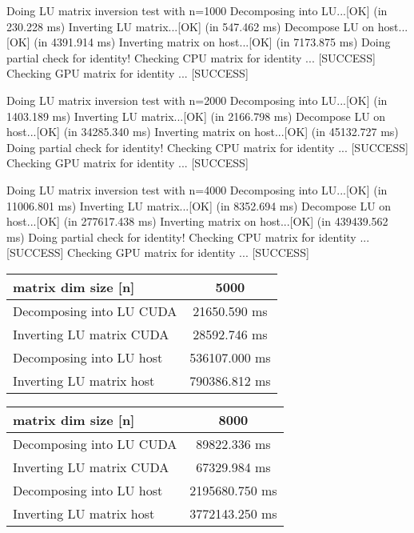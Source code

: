 
Doing LU matrix inversion test with n=1000
Decomposing into LU...[OK] (in 230.228 ms)
Inverting LU matrix...[OK] (in 547.462 ms)
Decompose LU on host...[OK] (in 4391.914 ms)
Inverting matrix on host...[OK] (in 7173.875 ms)
Doing partial check for identity!
Checking CPU matrix for identity ... [SUCCESS]
Checking GPU matrix for identity ... [SUCCESS]




Doing LU matrix inversion test with n=2000
Decomposing into LU...[OK] (in 1403.189 ms)
Inverting LU matrix...[OK] (in 2166.798 ms)
Decompose LU on host...[OK] (in 34285.340 ms)
Inverting matrix on host...[OK] (in 45132.727 ms)
Doing partial check for identity!
Checking CPU matrix for identity ... [SUCCESS]
Checking GPU matrix for identity ... [SUCCESS]




Doing LU matrix inversion test with n=4000
Decomposing into LU...[OK] (in 11006.801 ms)
Inverting LU matrix...[OK] (in 8352.694 ms)
Decompose LU on host...[OK] (in 277617.438 ms)
Inverting matrix on host...[OK] (in 439439.562 ms)
Doing partial check for identity!
Checking CPU matrix for identity ... [SUCCESS]
Checking GPU matrix for identity ... [SUCCESS]



\begin{tabular}{|l|c|}
	\hline
	matrix dim size [n] & 5000 \\
	\hline
	Decomposing into LU CUDA & 21650.590 ms\\
	Inverting LU matrix CUDA & 28592.746 ms\\
	\hline
	Decomposing into LU host & 536107.000 ms\\
	Inverting LU matrix host & 790386.812 ms\\		
	\hline
\end{tabular}



\begin{tabular}{|l|c|}
	\hline
	matrix dim size [n] & 8000 \\
	\hline
	Decomposing into LU CUDA & 89822.336 ms\\
	Inverting LU matrix CUDA & 67329.984 ms\\
	\hline
	Decomposing into LU host & 2195680.750 ms\\
	Inverting LU matrix host & 3772143.250 ms\\		
	\hline
\end{tabular}

